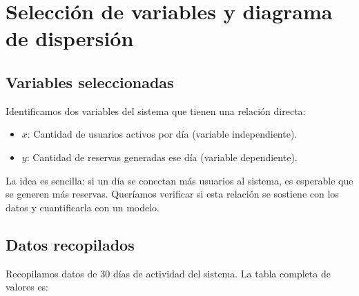 \documentclass[12pt,a4paper]{article}
\begin{document}
\section{Selección de variables y diagrama de dispersión}

\subsection{Variables seleccionadas}

Identificamos dos variables del sistema que tienen una relación directa:

\begin{itemize}[itemsep=4pt]
  \item $x$: Cantidad de usuarios activos por día (variable independiente).
  \item $y$: Cantidad de reservas generadas ese día (variable dependiente).
\end{itemize}

La idea es sencilla: si un día se conectan más usuarios al sistema, es esperable que se generen más reservas. Queríamos verificar si esta relación se sostiene con los datos y cuantificarla con un modelo.

\subsection{Datos recopilados}

Recopilamos datos de 30 días de actividad del sistema. La tabla completa de valores es:
\end{document}
